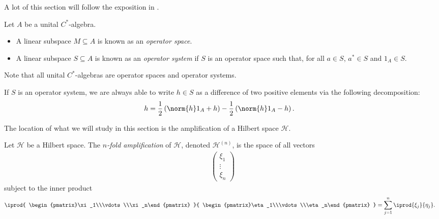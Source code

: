 A lot of this section will follow the exposition in \cite{completely_bounded_maps_and_operator_algebras}.
\begin{definition}\label{def:operator_systems_operator_spaces}
  Let $A$ be a unital $C^{\ast}$-algebra.
  \begin{itemize}
    \item A linear subspace $M\subseteq A$ is known as an \textit{operator space}.
    \item A linear subspace $S\subseteq A$ is known as an \textit{operator system} if $S$ is an operator space such that, for all $a\in S$, $a^{\ast}\in S$ and $1_A \in S$.
  \end{itemize}
  Note that all unital $C^{\ast}$-algebras are operator spaces and operator systems.
\end{definition}
\begin{remark}\label{rem:positive_elements_operator_system}
  If $S$ is an operator system, we are always able to write $h\in S$ as a difference of two positive elements via the following decomposition:
  \begin{align*}
    h &= \frac{1}{2}\left( \norm{h}1_A + h \right) - \frac{1}{2}\left( \norm{h}1_A - h \right).
  \end{align*}
\end{remark}
The location of what we will study in this section is the amplification of a Hilbert space $\mathcal{H}$.
\begin{definition}
  Let $\mathcal{H}$ be a Hilbert space. The \textit{$n$-fold amplification} of $\mathcal{H}$, denoted $\mathcal{H}^{(n)}$, is the space of all vectors
  \begin{align*}
    \begin{pmatrix}\xi_1\\\vdots\\\xi_n\end{pmatrix}
  \end{align*}
  subject to the inner product
  \begin{align*}
    \iprod{ \begin{pmatrix}\xi_1\\\vdots\\\xi_n\end{pmatrix} }{ \begin{pmatrix}\eta_1\\\vdots\\\eta_n\end{pmatrix} } &= \sum_{j=1}^{n} \iprod{\xi_j}{\eta_j}.
  \end{align*}
\end{definition}
